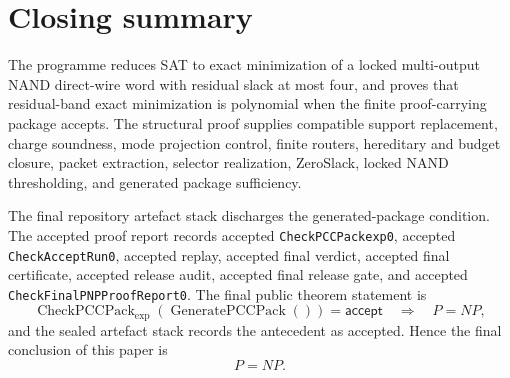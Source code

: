 \documentclass[10.5pt,a4paper]{article}
\newcommand{\CheckPack}{\operatorname{CheckPCCPack}_{\exp}}
\newcommand{\GenPack}{\operatorname{GeneratePCCPack}}
\begin{document}
\section{Closing summary}
The programme reduces SAT to exact minimization of a locked multi-output NAND direct-wire word with residual slack at most four, and proves that residual-band exact minimization is polynomial when the finite proof-carrying package accepts.  The structural proof supplies compatible support replacement, charge soundness, mode projection control, finite routers, hereditary and budget closure, packet extraction, selector realization, ZeroSlack, locked NAND thresholding, and generated package sufficiency.

The final repository artefact stack discharges the generated-package condition.  The accepted proof report records accepted \texttt{CheckPCCPackexp0}, accepted \texttt{CheckAcceptRun0}, accepted replay, accepted final verdict, accepted final certificate, accepted release audit, accepted final release gate, and accepted \texttt{CheckFinalPNPProofReport0}.  The final public theorem statement is
\[
\CheckPack(\GenPack())=\mathsf{accept}\quad\Longrightarrow\quad P=NP,
\]
and the sealed artefact stack records the antecedent as accepted.  Hence the final conclusion of this paper is
\[
P=NP.
\]
\end{document}
